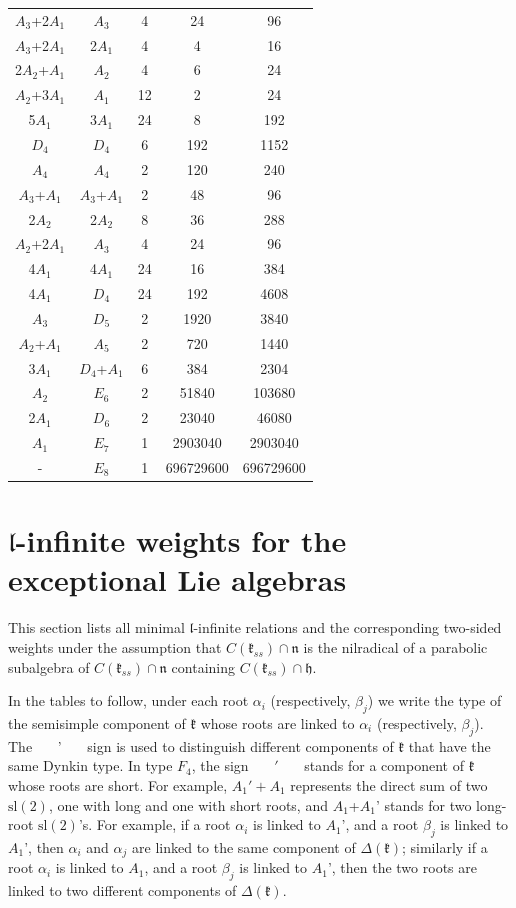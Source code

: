 \documentclass[12pt]{report}
\newcommand{\kk}{\mathfrak{k}}
\newcommand{\nn}{\mathfrak{n}}
\newcommand{\hh}{\mathfrak{h}}
\newcommand{\lL}{\mathfrak{l}}
\newcommand{\sL}{\mathrm{sl}}
\newcommand{\eps}{\varepsilon}
\begin{document}
\begin{appendix}
{\begin{longtable}{ccccc}
$A_3$+2$A_1$ & $A_3$ & 4 & 24 & 96 \\
$A_3$+2$A_1$ & 2$A_1$ & 4 & 4 & 16 \\
2$A_2$+$A_1$ & $A_2$ & 4 & 6 & 24 \\
$A_2$+3$A_1$ & $A_1$ & 12 & 2 & 24 \\
5$A_1$ & 3$A_1$ & 24 & 8 & 192 \\
$D_4$ & $D_4$ & 6 & 192 & 1152 \\
$A_4$ & $A_4$ & 2 & 120 & 240 \\
$A_3$+$A_1$ & $A_3$+$A_1$ & 2 & 48 & 96 \\
2$A_2$ & 2$A_2$ & 8 & 36 & 288 \\
$A_2$+2$A_1$ & $A_3$ & 4 & 24 & 96 \\
4$A_1$ & 4$A_1$ & 24 & 16 & 384 \\
4$A_1$ & $D_4$ & 24 & 192 & 4608 \\
$A_3$ & $D_5$ & 2 & 1920 & 3840 \\
$A_2$+$A_1$ & $A_5$ & 2 & 720 & 1440 \\
3$A_1$ & $D_4$+$A_1$ & 6 & 384 & 2304 \\
$A_2$ & $E_6$ & 2 & 51840 & 103680 \\
2$A_1$ & $D_6$ & 2 & 23040 & 46080 \\
$A_1$ & $E_7$ & 1 & 2903040 & 2903040 \\
- & $E_8$ & 1 & 696729600 & 696729600 \\
\end{longtable}
\section{$\lL$-infinite weights for the exceptional Lie algebras}\label{secAppendixExceptional}
This section lists all minimal $\lL$-infinite relations and the corresponding two-sided weights under the assumption that $C(\kk_{ss})\cap\nn$ is the nilradical of a parabolic subalgebra of  $C(\kk_{ss})\cap\nn$ containing $C(\kk_{ss})\cap \hh$. %

In the tables to follow, under each root $\alpha_i$ (respectively, $\beta_j$) we write the type of the semisimple component of $\kk$ whose roots are linked to $\alpha_i$ (respectively, $\beta_j$). The ~~~'~~~ sign is used to distinguish different components of $\kk$ that have the same Dynkin type. In type $F_4$, the sign ~~~$'$~~~ stands for a component of $\kk$ whose roots are short. For example, $A_1'+A_1$ represents the direct sum of two $\sL(2)$, one with long and one with short roots, and $A_1$+$A_1$' stands for two long-root $\sL(2)$'s. For example, if a root $\alpha_i$ is linked to $A_1$', and a root $\beta_j$ is linked to $A_1$', then $\alpha_i$ and $\alpha_j$ are linked to the same component of $\Delta(\kk)$; similarly if a root $\alpha_i$ is linked to $A_1$, and a root $\beta_j$ is linked to $A_1$', then the two roots are linked to two different components of $\Delta(\kk)$.
\newpage
\addtolength{\hoffset}{-2.5cm}
\addtolength{\textwidth}{8cm}
\addtolength{\voffset}{-3.3cm}
\addtolength{\textheight}{5.3cm}


}
\end{appendix}
\end{document}

